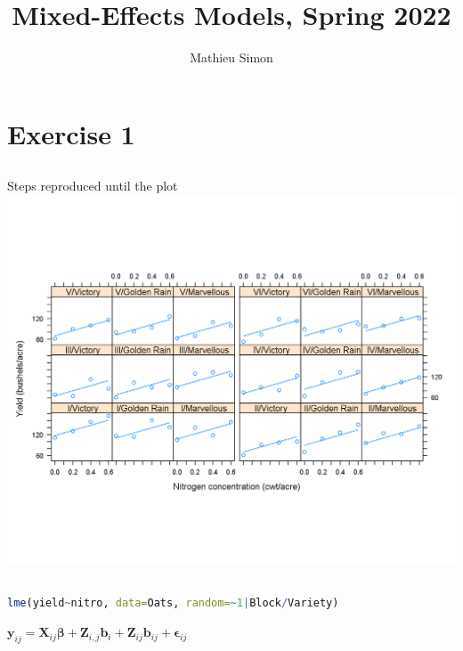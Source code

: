 \documentclass[a4paper,12pt]{article}
\begin{document}
	
	\title{Mixed-Effects Models, Spring 2022}
	\author{Mathieu Simon}
	\maketitle
	
	\setlength{\parskip}{1em}
	
	\section{Exercise 1}
	
	\subsection{}
		Steps reproduced until the plot\\
		\includegraphics[width=\linewidth]{Images/OatsPlot}
		
	\subsection{}
		
		\begin{lstlisting}[language=R]
lme(yield~nitro, data=Oats, random=~1|Block/Variety)
		\end{lstlisting}
		
		$ \mathbf{y}_{ij} = \mathbf{X}_{ij}\boldsymbol\beta + \mathbf{Z}_{i,j}\mathbf{b}_i + \mathbf{Z}_{ij}\mathbf{b}_{ij} + \boldsymbol\epsilon_{ij}$\\
		
\end{document}
